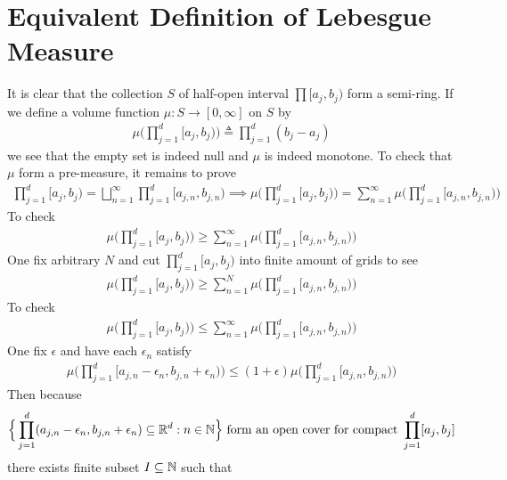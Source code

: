 \documentclass{report}
\begin{document}
\section{Equivalent Definition of Lebesgue Measure}
\begin{abstract}

\end{abstract}
\begin{mdframed}
It is clear that the collection $S$ of half-open interval $\prod [a_j,b_j)$ form a semi-ring. If we define a volume function $\mu : S\rightarrow [0,\infty]$ on  $S$ by 
 \begin{align*}
\mu \Big( \prod_{j=1}^d [a_j,b_j) \Big)\triangleq  \prod_{j=1}^d (b_j-a_j)
\end{align*}
we see that the empty set is indeed null and $\mu$ is indeed monotone. To check that $\mu$ form a pre-measure, it remains to prove 
\begin{align*}
\prod_{j=1}^d [a_j,b_j)= \bigsqcup_{n=1}^{\infty} \prod_{j=1}^d [a_{j,n},b_{j,n}) \implies \mu \Big(\prod_{j=1}^d [a_j,b_j) \Big)= \sum_{n=1}^{\infty} \mu \Big(\prod_{j=1}^d [a_{j,n},b_{j,n}) \Big)
\end{align*}
To check 
\begin{align}
\mu \Big(\prod_{j=1}^d [a_j,b_j) \Big) \geq \sum_{n=1}^{\infty} \mu \Big(\prod_{j=1}^d [a_{j,n},b_{j,n}) \Big)
\end{align}
One fix arbitrary $N$ and cut  $\prod_{j=1}^d [a_j,b_j)$ into finite amount of grids to see  
\begin{align*}
\mu \Big(\prod_{j=1}^d [a_j,b_j) \Big) \geq \sum_{n=1}^{N} \mu \Big(\prod_{j=1}^d [a_{j,n},b_{j,n}) \Big)
\end{align*}
To check 
\begin{align}
\label{58}
\mu \Big(\prod_{j=1}^d [a_j,b_j) \Big)\leq \sum_{n=1}^{\infty} \mu \Big(\prod _{j=1}^d [a_{j,n},b_{j,n}) \Big)
\end{align}
One fix $\epsilon$ and have each $\epsilon _n$ satisfy 
\begin{align*}
  \mu \Big(\prod_{j=1}^d [a_{j,n}-\epsilon_n , b_{j,n}+\epsilon_n) \Big) \leq (1+\epsilon )\mu  \Big(\prod_{j=1}^d [a_{j,n},b_{j,n}) \Big)
\end{align*}
Then because  
\begin{align*}
\Big\{ \prod_{j=1}^d (a_{j,n}-\epsilon_n , b_{j,n}+\epsilon_n )\subseteq \mathbb{R}^d:n\in\mathbb{N} \Big\}\text{ form an open cover for compact }\prod_{j=1}^d [a_j,b_j]
\end{align*}
there exists finite subset $I \subseteq \mathbb{N}$ such that 

\end{mdframed}
\end{document}

